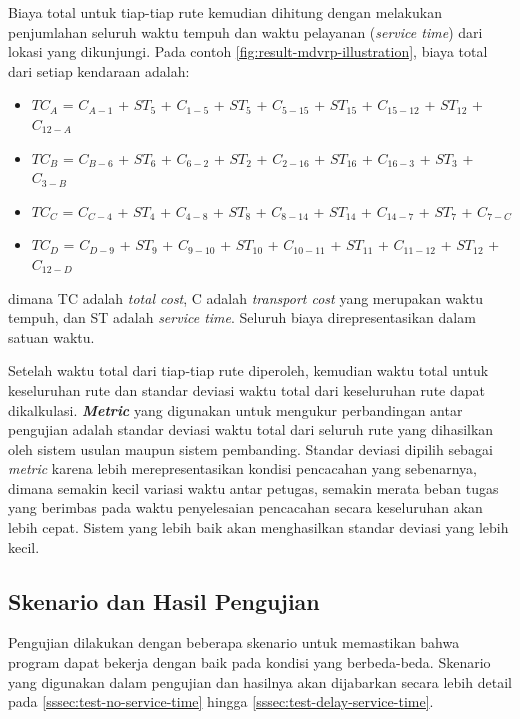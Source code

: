 Biaya total untuk tiap-tiap rute kemudian dihitung dengan melakukan penjumlahan seluruh waktu tempuh dan waktu pelayanan (\textit{service time}) dari lokasi yang dikunjungi. Pada contoh \autoref{fig:result-mdvrp-illustration}, biaya total dari setiap kendaraan adalah:

\begin{itemize}
	\item $TC_A$ = $C_{A-1}$ + $ST_5$ + $C_{1-5}$ + $ST_5$ + $C_{5-15}$ + $ST_15$ + $C_{15-12}$ + $ST_12$ + $C_{12-A}$
	\item $TC_B$ = $C_{B-6}$ + $ST_6$ + $C_{6-2}$ + $ST_2$ + $C_{2-16}$ + $ST_16$ + $C_{16-3}$ + $ST_3$ + $C_{3-B}$
	\item $TC_C$ = $C_{C-4}$ + $ST_4$ + $C_{4-8}$ + $ST_8$ + $C_{8-14}$ + $ST_14$ + $C_{14-7}$ + $ST_7$ + $C_{7-C}$
	\item $TC_D$ = $C_{D-9}$ + $ST_9$ + $C_{9-10}$ + $ST_10$ + $C_{10-11}$ + $ST_11$ + $C_{11-12}$ + $ST_12$ + $C_{12-D}$
\end{itemize}
dimana TC adalah \textit{total cost}, C adalah \textit{transport cost} yang merupakan waktu tempuh, dan ST adalah \textit{service time}. Seluruh biaya direpresentasikan dalam satuan waktu.


Setelah waktu total dari tiap-tiap rute diperoleh, kemudian waktu total untuk keseluruhan rute dan standar deviasi waktu total dari keseluruhan rute dapat dikalkulasi. \textbf{\textit{Metric}} yang digunakan untuk mengukur perbandingan antar pengujian adalah standar deviasi waktu total dari seluruh rute yang dihasilkan oleh sistem usulan maupun sistem pembanding. Standar deviasi dipilih sebagai \textit{metric} karena lebih merepresentasikan kondisi pencacahan yang sebenarnya, dimana semakin kecil variasi waktu antar petugas, semakin merata beban tugas yang berimbas pada waktu penyelesaian pencacahan secara keseluruhan akan lebih cepat. Sistem yang lebih baik akan menghasilkan standar deviasi yang lebih kecil.


\subsection{Skenario dan Hasil Pengujian}
Pengujian dilakukan dengan beberapa skenario untuk memastikan bahwa program dapat bekerja dengan baik pada kondisi yang berbeda-beda. Skenario yang digunakan dalam pengujian dan hasilnya akan dijabarkan secara lebih detail pada \autoref{sssec:test-no-service-time} hingga \autoref{sssec:test-delay-service-time}.


